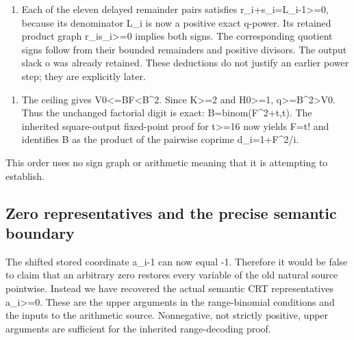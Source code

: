 \begin{enumerate}

\item[6.] Each of the eleven delayed remainder pairs satisfies r\_\allowbreak{}i+\allowbreak{}s\_\allowbreak{}i=\allowbreak{}L\_\allowbreak{}i-1\textgreater{}\allowbreak{}=\allowbreak{}0, because its denominator L\_\allowbreak{}i is now a positive exact q-power. Its retained product graph r\_\allowbreak{}i\textasteriskcentered{}\allowbreak{}s\_\allowbreak{}i\textgreater{}\allowbreak{}=\allowbreak{}0 implies both signs. The corresponding quotient signs follow from their bounded remainders and positive divisors. The output slack o was already retained. These deductions do not justify an earlier power step; they are explicitly later.

\end{enumerate}



\begin{enumerate}

\item[7.] The ceiling gives V0\textless{}\allowbreak{}=\allowbreak{}B\textasteriskcentered{}\allowbreak{}F\textless{}\allowbreak{}B\textasciicircum{}\allowbreak{}2. Since K\textgreater{}\allowbreak{}=\allowbreak{}2 and H0\textgreater{}\allowbreak{}=\allowbreak{}1, q\textgreater{}\allowbreak{}=\allowbreak{}B\textasciicircum{}\allowbreak{}2\textgreater{}\allowbreak{}V0. Thus the unchanged factorial digit is exact: B=\allowbreak{}binom(F\textasciicircum{}\allowbreak{}2+\allowbreak{}t,t). The inherited square-output fixed-point proof for t\textgreater{}\allowbreak{}=\allowbreak{}16 now yields F=\allowbreak{}t! and identifies B as the product of the pairwise coprime d\_\allowbreak{}i=\allowbreak{}1+\allowbreak{}F\textasciicircum{}\allowbreak{}2/\allowbreak{}i.

\end{enumerate}



This order uses no sign graph or arithmetic meaning that it is attempting to establish.



\subsection{Zero representatives and the precise semantic boundary}



The shifted stored coordinate a\_\allowbreak{}i-1 can now equal -1. Therefore it would be false to claim that an arbitrary zero restores every variable of the old natural source pointwise. Instead we have recovered the actual semantic CRT representatives a\_\allowbreak{}i\textgreater{}\allowbreak{}=\allowbreak{}0. These are the upper arguments in the range-binomial conditions and the inputs to the arithmetic source. Nonnegative, not strictly positive, upper arguments are sufficient for the inherited range-decoding proof.



